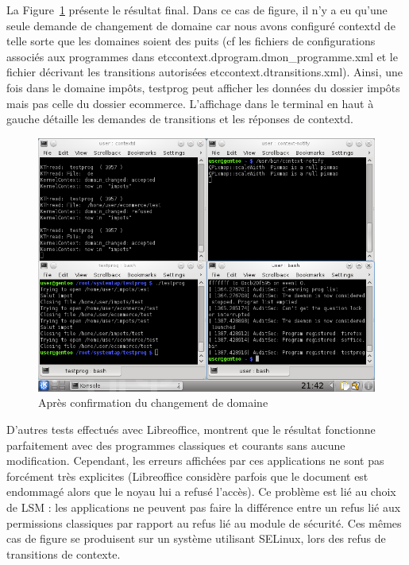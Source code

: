 \documentclass[pdftex,a4paper,titlepage,11pt]{article}
\begin{document}
La Figure~\ref{FIN} présente le résultat final. Dans ce cas de figure, il n'y a eu qu'une seule demande de changement de domaine car nous avons configuré contextd de telle sorte que les domaines soient des puits (cf les fichiers de configurations associés aux programmes dans \/etc\/context.d\/program.d\/mon\_programme.xml et le fichier décrivant les transitions autorisées \/etc\/context.d\/transitions.xml). Ainsi, une fois dans le domaine impôts, testprog peut afficher les données du dossier impôts mais pas celle du dossier ecommerce. L'affichage dans le terminal en haut à gauche détaille les demandes de transitions et les réponses de contextd.

\begin{figure}%
	\centering
	\includegraphics[scale=0.5]{attachements/capture_fin.png}
	\caption{Après confirmation du changement de domaine}
	\label{FIN}
\end{figure}

D'autres tests effectués avec Libreoffice, montrent que le résultat fonctionne parfaitement avec des programmes classiques et courants sans aucune modification. Cependant, les erreurs affichées par ces applications ne sont pas forcément très explicites (Libreoffice considère parfois que le document est endommagé alors que le noyau lui a refusé l'accès). Ce problème est lié au choix de LSM : les applications ne peuvent pas faire la différence entre un refus lié aux permissions classiques par rapport au refus lié au module de sécurité. Ces mêmes cas de figure se produisent sur un système utilisant SELinux, lors des refus de transitions de contexte.
\end{document}
